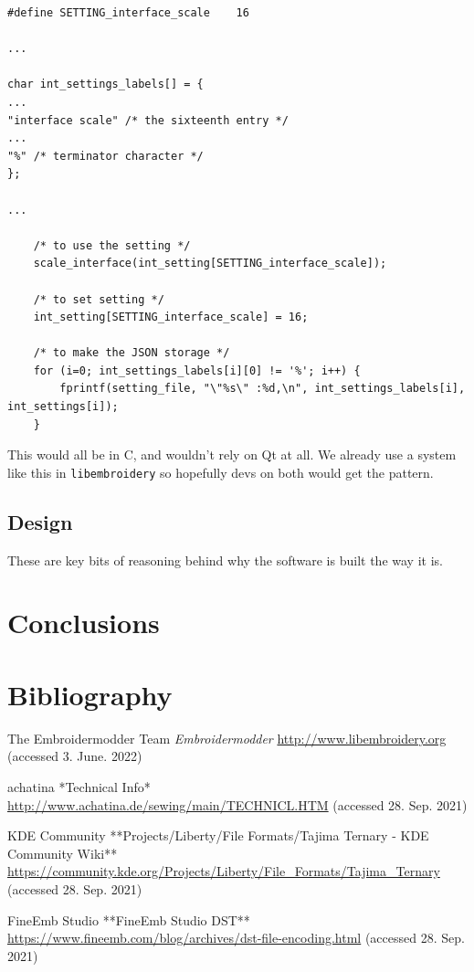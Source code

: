 \documentclass[10pt]{report}
\begin{document}
\begin{lstlisting}
#define SETTING_interface_scale    16

...

char int_settings_labels[] = {
...
"interface scale" /* the sixteenth entry */
...
"%" /* terminator character */
};

...

    /* to use the setting */
    scale_interface(int_setting[SETTING_interface_scale]);

    /* to set setting */
    int_setting[SETTING_interface_scale] = 16;

    /* to make the JSON storage */
    for (i=0; int_settings_labels[i][0] != '%'; i++) {
        fprintf(setting_file, "\"%s\" :%d,\n", int_settings_labels[i], int_settings[i]);
    }
\end{lstlisting}

This would all be in C, and wouldn't rely on Qt at all. We already use a
system like this in \texttt{libembroidery} so hopefully devs on both
would get the pattern.

\subsection{Design}

These are key bits of reasoning behind why the software is built the way
it is.

\section{Conclusions}


\section{Bibliography}

The Embroidermodder Team \emph{Embroidermodder}
\url{http://www.libembroidery.org} (accessed 3. June. 2022)

achatina *Technical Info*
\url{http://www.achatina.de/sewing/main/TECHNICL.HTM} (accessed 28. Sep. 2021)

KDE Community
**Projects/Liberty/File Formats/Tajima Ternary - KDE Community Wiki**
\url{https://community.kde.org/Projects/Liberty/File_Formats/Tajima_Ternary}
(accessed 28. Sep. 2021)

FineEmb Studio
**FineEmb Studio \guillemotright DST**
\url{https://www.fineemb.com/blog/archives/dst-file-encoding.html}
(accessed 28. Sep. 2021)
\end{document}
